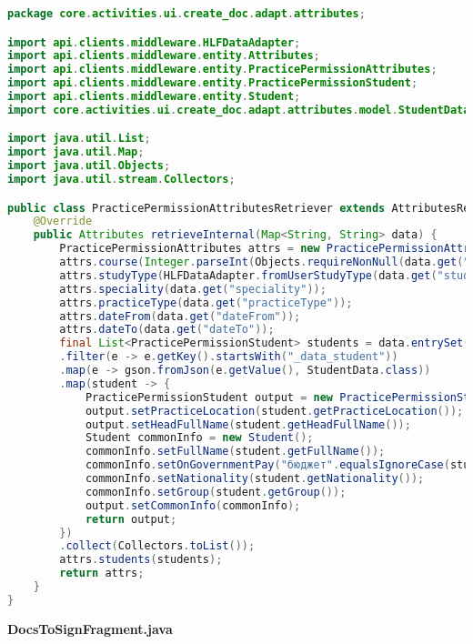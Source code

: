 \begin{lstlisting}[language=Java]
package core.activities.ui.create_doc.adapt.attributes;

import api.clients.middleware.HLFDataAdapter;
import api.clients.middleware.entity.Attributes;
import api.clients.middleware.entity.PracticePermissionAttributes;
import api.clients.middleware.entity.PracticePermissionStudent;
import api.clients.middleware.entity.Student;
import core.activities.ui.create_doc.adapt.attributes.model.StudentData;

import java.util.List;
import java.util.Map;
import java.util.Objects;
import java.util.stream.Collectors;

public class PracticePermissionAttributesRetriever extends AttributesRetriever{
	@Override
	public Attributes retrieveInternal(Map<String, String> data) {
		PracticePermissionAttributes attrs = new PracticePermissionAttributes();
		attrs.course(Integer.parseInt(Objects.requireNonNull(data.get("course"))));
		attrs.studyType(HLFDataAdapter.fromUserStudyType(data.get("studyType")));
		attrs.speciality(data.get("speciality"));
		attrs.practiceType(data.get("practiceType"));
		attrs.dateFrom(data.get("dateFrom"));
		attrs.dateTo(data.get("dateTo"));
		final List<PracticePermissionStudent> students = data.entrySet().stream()
		.filter(e -> e.getKey().startsWith("_data_student"))
		.map(e -> gson.fromJson(e.getValue(), StudentData.class))
		.map(student -> {
			PracticePermissionStudent output = new PracticePermissionStudent();
			output.setPracticeLocation(student.getPracticeLocation());
			output.setHeadFullName(student.getHeadFullName());
			Student commonInfo = new Student();
			commonInfo.setFullName(student.getFullName());
			commonInfo.setOnGovernmentPay("бюджет".equalsIgnoreCase(student.getOnGovernmentPay()));
			commonInfo.setNationality(student.getNationality());
			commonInfo.setGroup(student.getGroup());
			output.setCommonInfo(commonInfo);
			return output;
		})
		.collect(Collectors.toList());
		attrs.students(students);
		return attrs;
	}
}

\end{lstlisting}
\textbf{DocsToSignFragment.java}
